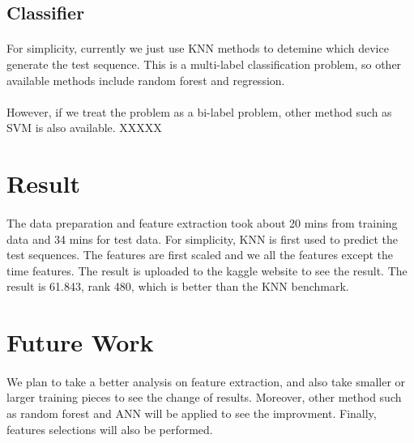 \documentclass{article}
\begin{document}
	
		\subsection{Classifier} %
		\label{sub:classifier}
		\paragraph{} For simplicity, currently we just use KNN methods to detemine which device generate the test sequence. This is a multi-label classification problem, so other available methods include random forest and regression. 
		
		\paragraph{} However, if we treat the problem as a bi-label problem, other method such as SVM is also available. XXXXX
	
	\section{Result} %
	\label{sec:result}
	\paragraph{} The data preparation and feature extraction took about 20 mins from training data and 34 mins for test data. For simplicity, KNN is first used to predict the test sequences. The features are first scaled and we all the features except the time features. The result is uploaded to the kaggle website to see the result. The result is 61.843, rank 480, which is better than the KNN benchmark. 
	
	
	
	\section{Future Work} %
	\label{sec:future_work}
	\paragraph{} We plan to take a better analysis on feature extraction, and also take smaller or larger training pieces to see the change of results. Moreover, other method such as random forest and ANN will be applied to see the improvment. Finally, features selections will also be performed. 
	
\end{document}

